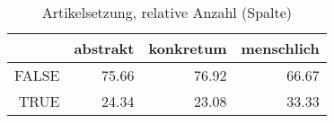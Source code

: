 \begin{table}[ht]
\centering
\begin{tabular}{rrrr}
  \hline
 & abstrakt & konkretum & menschlich \\ 
  \hline
FALSE & 75.66 & 76.92 & 66.67 \\ 
  TRUE & 24.34 & 23.08 & 33.33 \\ 
   \hline
\end{tabular}
\caption{Artikelsetzung, relative Anzahl (Spalte)} 
\end{table}
